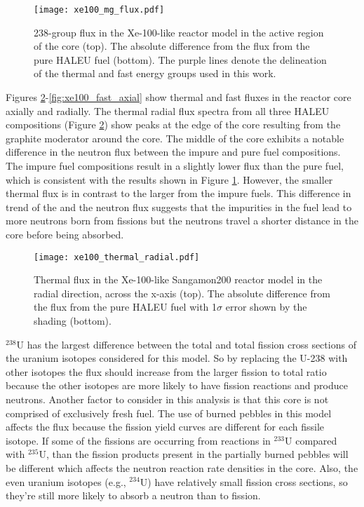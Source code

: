 \begin{figure}[ht]
        \centering 
        \texttt{[image: xe100\_mg\_flux.pdf]}
        \caption{238-group flux in the Xe-100-like 
        reactor model in the active region of the core (top). 
        The absolute difference from the flux from 
        the pure \gls{HALEU} fuel (bottom). The purple lines 
        denote the delineation of the thermal and fast 
        energy groups used in this work.}
        \label{fig:xe100_mg_flux}
\end{figure}

Figures \ref{fig:xe100_thermal_radial}-\ref{fig:xe100_fast_axial} show 
thermal and fast fluxes in the reactor core axially and radially. 
The thermal radial flux spectra from all three \gls{HALEU} compositions 
(Figure \ref{fig:xe100_thermal_radial})
show peaks at the edge of the core resulting from the graphite moderator 
around the core. The middle of the core exhibits a notable 
difference in the neutron flux between the impure and pure fuel 
compositions. The impure fuel compositions result in a slightly 
lower flux than the pure fuel, which is consistent with the 
results shown in Figure \ref{fig:xe100_mg_flux}. 
However, the smaller thermal flux is in contrast to the larger 
\keff from the impure fuels. This difference in trend of the \keff and 
the neutron flux suggests that the impurities in the fuel lead to 
more neutrons born from fissions but the neutrons travel a shorter 
distance in the core before being absorbed. 

\begin{figure}[ht]
        \centering 
        \texttt{[image: xe100\_thermal\_radial.pdf]}
        \caption{Thermal flux in the Xe-100-like Sangamon200 
        reactor model in the radial direction, across the 
        x-axis (top). The absolute difference from the flux from 
        the pure \gls{HALEU} fuel with 1$\sigma$ error shown by 
        the shading (bottom).}
        \label{fig:xe100_thermal_radial}
\end{figure}

$^{238}$U has the largest difference between the total and total 
fission cross sections of the uranium isotopes considered for this model. 
So by replacing the U-238 with other isotopes the flux should 
increase from the larger fission to total ratio because the other isotopes 
are more likely to have fission reactions and produce neutrons.
Another factor to consider in this analysis is that this core is not 
comprised of exclusively fresh fuel. 
The use of burned pebbles in this model affects the flux because the 
fission yield curves are different for each fissile isotope. If some 
of the fissions are occurring from reactions in $^{233}$U compared with 
$^{235}$U, than the fission products present in the partially 
burned pebbles will be different which affects the neutron reaction 
rate densities in the core. Also, the even uranium isotopes 
(e.g., $^{234}$U) have relatively small fission cross sections, 
so they're still more likely to absorb a neutron than to fission. 

